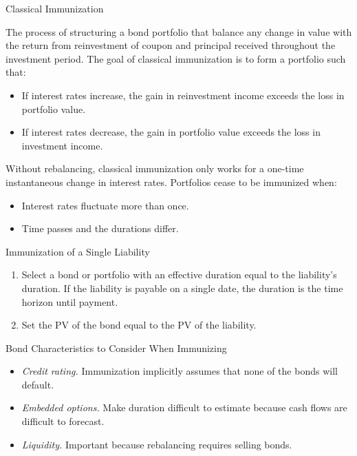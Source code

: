 \documentclass[../custom]{flashcards}
\begin{document}
\begin{flashcard}{Classical Immunization}
    \begin{flushleft}
        The process of structuring a bond portfolio that balance any change in value with the return from reinvestment of coupon and principal received throughout the investment period. The goal of classical immunization is to form a portfolio such that:
        \begin{itemize}
            \item If interest rates increase, the gain in reinvestment income exceeds the loss in portfolio value.
            \item If interest rates decrease, the gain in portfolio value exceeds the loss in investment income.
        \end{itemize}
        Without rebalancing, classical immunization only works for a one-time instantaneous change in interest rates. Portfolios cease to be immunized when:
        \begin{itemize}
            \item Interest rates fluctuate more than once.
            \item Time passes and the durations differ.
        \end{itemize}
    \end{flushleft}
\end{flashcard}

\begin{flashcard}{Immunization of a Single Liability}
    \begin{enumerate}
        \item Select a bond or portfolio with an effective duration equal to the liability's duration. If the liability is payable on a single date, the duration is the time horizon until payment.
        \item Set the PV of the bond equal to the PV of the liability.
    \end{enumerate}
\end{flashcard}

\begin{flashcard}{Bond Characteristics to Consider When Immunizing}
    \begin{itemize}
        \item \textit{Credit rating.} Immunization implicitly assumes that none of the bonds will default.
        \item \textit{Embedded options.} Make duration difficult to estimate because cash flows are difficult to forecast.
        \item \textit{Liquidity.} Important because rebalancing requires selling bonds.
    \end{itemize}
\end{flashcard}
\end{document}

